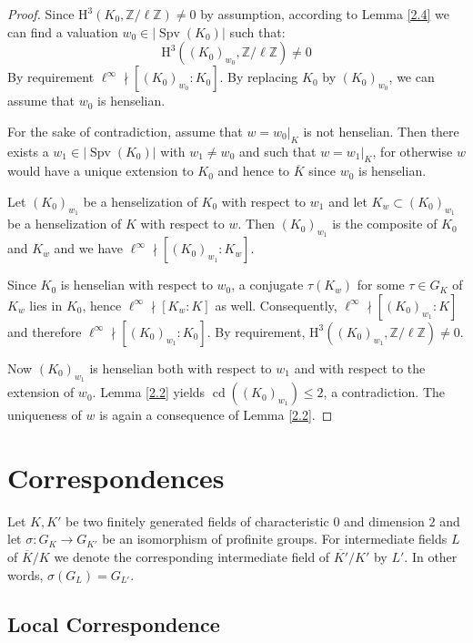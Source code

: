 \begin{proof}
Since $\mathrm{H}^3(K_0, \mathbb{Z}/\ell\mathbb{Z})\neq 0$ by assumption, according to Lemma \ref{2.4} we can find a valuation $w_0\in|\operatorname{Spv}(K_0)|$ such that:
\[ \mathrm{H}^3((K_0)_{w_0}, \mathbb{Z}/\ell\mathbb{Z}) \neq 0 \]
By requirement $\ell^\infty \nmid [(K_0)_{w_0} : K_0]$. By replacing $K_0$ by $(K_0)_{w_0}$, we can assume that $w_0$ is henselian.

For the sake of contradiction, assume that $w = w_0|_K$ is not henselian. Then there exists a $w_1\in|\operatorname{Spv}(K_0)|$ with $w_1\neq w_0$ and such that $w = w_1|_K$, for otherwise $w$ would have a unique extension to $K_0$ and hence to $\overline{K}$ since $w_0$ is henselian.

Let $(K_0)_{w_1}$ be a henselization of $K_0$ with respect to $w_1$ and let $K_w\subset (K_0)_{w_1}$ be a henselization of $K$ with respect to $w$. Then $(K_0)_{w_1}$ is the composite of $K_0$ and $K_w$ and we have $\ell^\infty\nmid [(K_0)_{w_1} : K_w]$.

Since $K_0$ is henselian with respect to $w_0$, a conjugate $\tau(K_w)$ for some $\tau\in G_K$ of $K_w$ lies in $K_0$, hence $\ell^\infty\nmid [K_w : K]$ as well. Consequently, $\ell^\infty \nmid [(K_0)_{w_1} : K]$ and therefore $\ell^\infty \nmid [(K_0)_{w_1} : K_0]$. By requirement, $\mathrm{H}^3((K_0)_{w_1}, \mathbb{Z}/\ell\mathbb{Z}) \neq 0$.

Now $(K_0)_{w_1}$ is henselian both with respect to $w_1$ and with respect to the extension of $w_0$. Lemma \ref{2.2} yields $\operatorname{cd}((K_0)_{w_1})\leq 2$, a contradiction. The uniqueness of $w$ is again a consequence of Lemma \ref{2.2}.
\end{proof}

\chapter{Correspondences}

Let $K,K'$ be two finitely generated fields of characteristic $0$ and dimension $2$ and let $\sigma:G_K\to G_{K'}$ be an isomorphism of profinite groups. For intermediate fields $L$ of $\overline{K}/K$ we denote the corresponding intermediate field of $\overline{K'}/K'$ by $L'$. In other words, $\sigma (G_L)=G_{L'}$.

\section{Local Correspondence}

